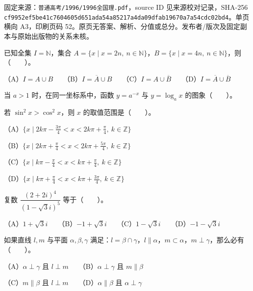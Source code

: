 

\begin{gktip}
固定来源：\texttt{普通高考/1996/1996全国理.pdf}，source ID 见来源校对记录，SHA-256 \texttt{cf9952ef5be41c7604605d651ada54a85217a4da09dfab19670a7a54cdc02bd4}。单页横向 A3，印刷页码 52。原页无答案、解析、分值或总分。发布者/版次及固定副本与原始出版物的关系未核。
\end{gktip}

\begin{question}
已知全集 $I=\mathbb{N}$，集合 $A=\{x\mid x=2n,\ n\in\mathbb{N}\}$，$B=\{x\mid x=4n,\ n\in\mathbb{N}\}$，则\mbox{（　　）}。

（A）$I=A\cup B$　　（B）$I=\overline{A}\cup B$　　（C）$I=A\cup\overline{B}$　　（D）$I=\overline{A}\cup\overline{B}$

\Needspace{0.4\textheight}
\end{question}
\begin{question}
当 $a>1$ 时，在同一坐标系中，函数 $y=a^{-x}$ 与 $y=\log_a x$ 的图象\mbox{（　　）}。
\nopagebreak[4]
\begin{center}\end{center}
\nopagebreak[4]
\end{question}
\begin{question}
若 $\sin^2 x>\cos^2 x$，则 $x$ 的取值范围是\mbox{（　　）}。

（A）$\{x\mid 2k\pi-\frac{3\pi}{4}<x<2k\pi+\frac{\pi}{4},\ k\in\mathbb{Z}\}$

（B）$\{x\mid 2k\pi+\frac{\pi}{4}<x<2k\pi+\frac{5\pi}{4},\ k\in\mathbb{Z}\}$

（C）$\{x\mid k\pi-\frac{\pi}{4}<x<k\pi+\frac{\pi}{4},\ k\in\mathbb{Z}\}$

（D）$\{x\mid k\pi+\frac{\pi}{4}<x<k\pi+\frac{3\pi}{4},\ k\in\mathbb{Z}\}$

\end{question}
\begin{question}
复数 $\dfrac{(2+2i)^4}{(1-\sqrt{3}i)^5}$ 等于\mbox{（　　）}。

（A）$1+\sqrt{3}i$　　（B）$-1+\sqrt{3}i$　　（C）$1-\sqrt{3}i$　　（D）$-1-\sqrt{3}i$

\end{question}
\begin{question}
如果直线 $l,m$ 与平面 $\alpha,\beta,\gamma$ 满足：$l=\beta\cap\gamma$，$l\parallel\alpha$，$m\subset\alpha$，$m\perp\gamma$，那么必有\mbox{（　　）}。

（A）$\alpha\perp\gamma$ 且 $l\perp m$　　（B）$\alpha\perp\gamma$ 且 $m\parallel\beta$

（C）$m\parallel\beta$ 且 $l\perp m$　　（D）$\alpha\parallel\beta$ 且 $\alpha\perp\gamma$

\end{question}
